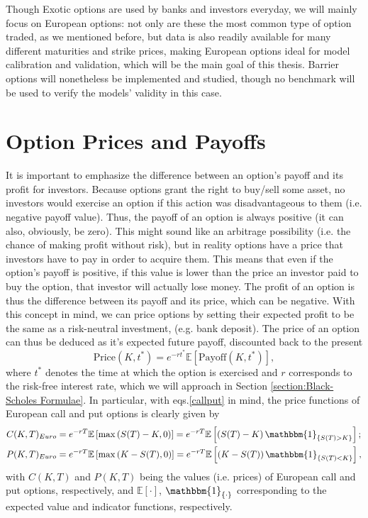 Though Exotic options are used by banks and investors everyday, we will mainly focus on European options: not only are these the most common type of option traded, as we mentioned before, but data is also readily available for many different maturities and strike prices, making European options ideal for model calibration and validation, which will be the main goal of this thesis.
Barrier options will nonetheless be implemented and studied, though no benchmark will be used to verify the models' validity in this case.


\section{Option Prices and Payoffs}
It is important to emphasize the difference between an option's payoff and its profit for investors. Because options grant the right to buy/sell some asset, no investors would exercise an option if this action was disadvantageous to them (i.e. negative payoff value). Thus, the payoff of an option is always positive (it can also, obviously, be zero). This might sound like an arbitrage possibility (i.e. the chance of making profit without risk), but in reality options have a price that investors have to pay in order to acquire them. This means that even if the option's payoff is positive, if this value is lower than the price an investor paid to buy the option, that investor will actually lose money. The profit of an option is thus the difference between its payoff and its price, which can be negative.
With this concept in mind, we can price options by setting their expected profit to be the same as a risk-neutral investment, (e.g. bank deposit). The price of an option can thus be deduced as it's expected future payoff, discounted back to the present
\begin{equation}
\text{Price}(K,t^*)=e^{-rt^*}\mathbb{E}\left[\text{Payoff}(K,t^*)\right],
\end{equation}
\noindent where $t^*$ denotes the time at which the option is exercised and $r$ corresponds to the risk-free interest rate, which we will approach in Section \ref{section:Black-Scholes Formulae}.
In particular, with eqs.\eqref{callput} in mind, the price functions of European call and put options is clearly given by
\begin{equation}\label{callprice}
\begin{split}
&C(K,T)_{Euro}=e^{-rT}\mathbb{E}\left[\max\left(S(T)-K,0\right)\right]=e^{-rT}\mathbb{E}\left[\left(S(T)-K\right)\mathbbm{1}_{\left\{S(T)>K\right\}}\right];\\
&P(K,T)_{Euro}=e^{-rT}\mathbb{E}\left[\max\left(K-S(T),0\right)\right]=e^{-rT}\mathbb{E}\left[\left(K-S(T)\right)\mathbbm{1}_{\left\{S(T)<K\right\}}\right],
\end{split}
\end{equation}
\noindent with $C(K,T)$ and $P(K,T)$ being the values (i.e. prices) of European call and put options, respectively, and $\mathbb{E}[\cdot]$, $\mathbbm{1}_{\{\cdot\}}$ corresponding to the expected value and indicator functions, respectively.

